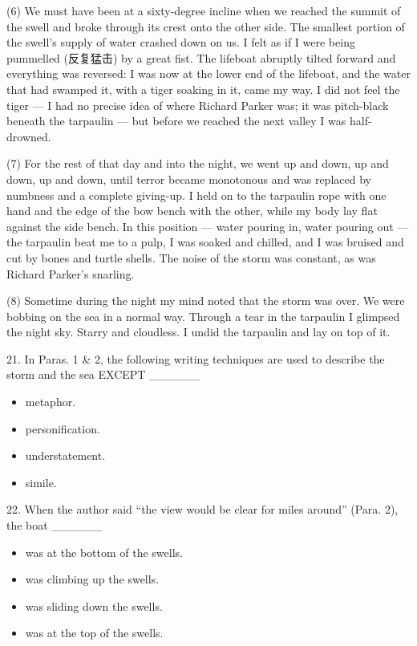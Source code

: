 \documentclass[UTF8,11pt]{ctexart}
\begin{document}
(6) We must have been at a sixty-degree incline when we reached the summit of the swell and broke through its crest onto the other side. The smallest portion of the swell’s supply of water crashed down on us. I felt as if I were being pummelled (反复猛击) by a great fist. The lifeboat abruptly tilted forward and everything was reversed: I was now at the lower end of the lifeboat, and the water that had swamped it, with a tiger soaking in it, came my way. I did not feel the tiger — I had no precise idea of where Richard Parker was; it was pitch-black beneath the tarpaulin — but before we reached the next valley I was half-drowned.


(7) For the rest of that day and into the night, we went up and down, up and down, up and down, until terror became monotonous and was replaced by numbness and a complete giving-up. I held on to the tarpaulin rope with one hand and the edge of the bow bench with the other, while my body lay flat against the side bench. In this position — water pouring in, water pouring out — the tarpaulin beat me to a pulp, I was soaked and chilled, and I was bruised and cut by bones and turtle shells. The noise of the storm was constant, as was Richard Parker’s snarling.


(8) Sometime during the night my mind noted that the storm was over. We were bobbing on the sea in a normal way. Through a tear in the tarpaulin I glimpsed the night sky. Starry and cloudless. I undid the tarpaulin and lay on top of it.


21. In Paras. 1 \& 2, the following writing techniques are used to describe the storm and the sea EXCEPT \_\_\_\_\_\_


\begin{itemize}[leftmargin=2em,itemsep=.2em,topsep=.4em]\item[A.] metaphor.
\item[B.] personification.
\item[C.] understatement.
\item[D.] simile.
\end{itemize}

22. When the author said “the view would be clear for miles around” (Para. 2), the boat \_\_\_\_\_\_


\begin{itemize}[leftmargin=2em,itemsep=.2em,topsep=.4em]\item[A.] was at the bottom of the swells.
\item[B.] was climbing up the swells.
\item[C.] was sliding down the swells.
\item[D.] was at the top of the swells.
\end{itemize}
\end{document}
